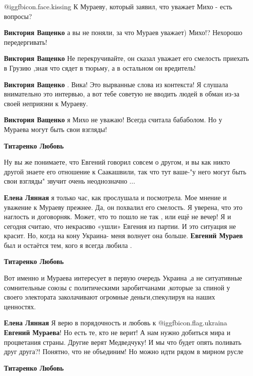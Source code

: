 \begin{itemize}
 @igg{fbicon.face.kissing} К Мураеву, который заявил, что уважает Михо - есть вопросы?

\begin{itemize} %
\textbf{Виктория Ващенко} а вы не поняли, за что Мураев уважает) Михо!?
Нехорошо передергивать!

\textbf{Виктория Ващенко} Не перекручивайте, он сказал уважает его смелость приехать в Грузию ,зная что сядет в тюрьму, а в остальном он вредитель!

\textbf{Виктория Ващенко} .
Вика! Это вырванные слова из контекста! Я слушала внимательно это интервью, а вот тебе советую не вводить людей в обман из-за своей неприязни к Мураеву.

\textbf{Виктория Ващенко} я Михо не уважаю! Всегда считала бабаболом. Но у Мураева могут быть свои взгляды!

\textbf{Титаренко Любовь} 

Ну вы же понимаете, что Евгений говорил совсем о другом, и вы как никто другой
знаете его отношение к Саакашвили, так что тут ваше-"у него могут быть свои
взгляды" звучит очень неоднозначно ...

\textbf{Елена Лянная} я только час, как прослушала и посмотрела. Мое мнение и уважение к Мураеву прежнее.
Да, он похвалил его смелость.
Я уверена, что это наглость и договорняк.
Может, что то пошло не так , или ещё не вечер!
Я и сегодня считаю, что некрасиво «ушли» Евгения из партии.
И это ситуация не красит.
Но, когда на кону Украина- меня волнует она больше. \textbf{Евгений Мураев} был и остаётся тем, кого я всегда любила .

\textbf{Титаренко Любовь} 

Вот именно и Мураева интересует в первую очередь Украина ,а не ситуативные
сомнительные союзы с политическими заробитчанами ,которые за спиной у своего
электората заколачивают огромные деньги,спекулируя на наших ценностях.

\textbf{Елена Лянная} Я верю в порядочность и любовь к @igg{fbicon.flag.ukraina} \textbf{Евгений Мураева}!
Но есть те, кто не верит!
А нам нужно добиться мира и процветания страны.
Другие верят Медведчуку!
И мы что будет опять поливать друг друга?! Понятно, что не объединим! Но можно идти рядом в мирном русле

\textbf{Титаренко Любовь} 


\end{itemize}
\end{itemize}
